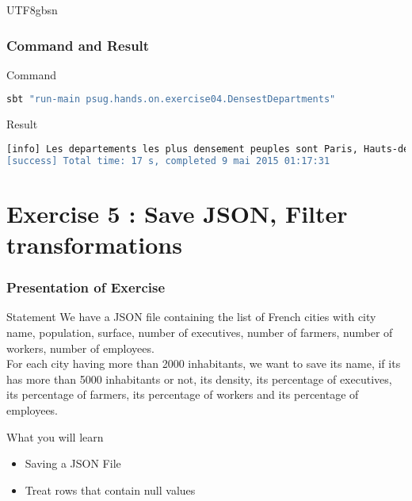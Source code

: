 \documentclass[slidetop,9pt,utf8]{beamer}
\begin{document}
\begin{CJK}{UTF8}{gbsn}
\begin{frame}
\end{frame}

\begin{frame}[fragile]
  \frametitle{Command and Result}

  \begin{block}{Command}
    \begin{lstlisting}[language=bash, style=terminal]
sbt "run-main psug.hands.on.exercise04.DensestDepartments"
    \end{lstlisting}
  \end{block}

  \begin{block}{Result}
    \begin{lstlisting}[language=bash, style=terminal]
[info] Les departements les plus densement peuples sont Paris, Hauts-de-Seine, Seine-Saint-Denis, Val-de-Marne, Val-d'Oise, Essonne, Yvelines, Rhone, Nord, Bouches-du-Rhone
[success] Total time: 17 s, completed 9 mai 2015 01:17:31
    \end{lstlisting}
  \end{block}

\end{frame}

\section{Exercise 5 : Save JSON, Filter transformations}

\begin{frame}
  \frametitle{Presentation of Exercise}

  \begin{block}{Statement}
    We have a JSON file containing the list of French cities with city name, population, surface, number of executives, number of farmers, number of workers, number of employees. 
    \\ \medskip
    For each city having more than 2000 inhabitants, we want to save its name, if its has more than 5000 inhabitants or not, its density, its percentage of executives, its percentage of farmers, its percentage of workers and its percentage of employees.
  \end{block}

  \begin{block}{What you will learn}
    \begin{itemize}
      \item Saving a JSON File
      \item Treat rows that contain null values
    \end{itemize}
  \end{block}


\end{frame}
\end{CJK}
\end{document}
